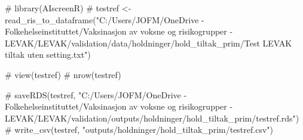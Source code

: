 \documentclass[
  letterpaper,
  DIV=11,
  numbers=noendperiod]{scrartcl}
\newenvironment{Shaded}{\begin{snugshade}}{\end{snugshade}}
\newcommand{\CommentTok}[1]{\textcolor[rgb]{0.37,0.37,0.37}{#1}}
\begin{document}
\begin{Shaded}
\begin{Highlighting}[]
\CommentTok{\# library(AIscreenR)}
\CommentTok{\# testref \textless{}{-} read\_ris\_to\_dataframe("C:/Users/JOFM/OneDrive {-} Folkehelseinstituttet/Vaksinasjon av voksne og risikogrupper {-} LEVAK/LEVAK/validation/data/holdninger/hold\_tiltak\_prim/Test LEVAK tiltak uten setting.txt")}

\CommentTok{\# view(testref)}
\CommentTok{\# nrow(testref)}

\CommentTok{\# saveRDS(testref, "C:/Users/JOFM/OneDrive {-} Folkehelseinstituttet/Vaksinasjon av voksne og risikogrupper {-} LEVAK/LEVAK/validation/outputs/holdninger/hold\_tiltak\_prim/testref.rds")}
\CommentTok{\# write\_csv(testref, "outputs/holdninger/hold\_tiltak\_prim/testref.csv")}
\end{Highlighting}
\end{Shaded}
\end{document}
